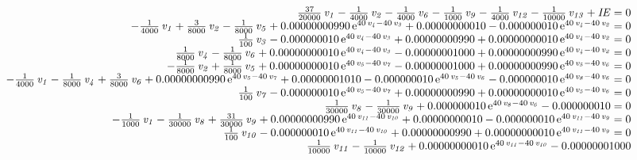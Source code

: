 \documentclass[conference,letterpaper,onecolumn]{IEEEtran}
\begin{document}
{\tiny
\begin{equation}
\begin{array}{r}
{\frac {37}{20000}}\,{\it v_1}-{\frac {1}{4000}}\,{\it v_2}-{\frac {1}{
 4000}}\,{\it v_6}-{\frac {1}{1000}}\,{\it v_9}-{\frac {1}{4000}}\,{\it 
v_{12}}-{\frac {1}{10000}}\,{\it v_{13}}+{\it IE}=0 \\
-{\frac {1}{4000}}\,{\it v_1}+{\frac {3}{8000}}\,{\it v_2}-{\frac {1}{
8000}}\,{\it v_5}+ 0.00000000990\,{{\rm e}^{40\,{\it v_4}-40\,{\it v_3}}}
+ 0.00000000010- 0.000000010\,{{\rm e}^{40\,{\it v_4}-40\,{\it v_2}}}=0  \\
{\frac {1}{100}}\,{\it v_3}- 0.000000010\,{{\rm e}^{40\,{\it v_4}-40\,{
\it v_3}}}+ 0.00000000990+ 0.00000000010\,{{\rm e}^{40\,{\it v_4}-40\,{
\it v_2}}}=0 \\
{\frac {1}{8000}}\,{\it v_4}-{\frac {1}{8000}}\,{\it v_6}+ 0.00000000010
\,{{\rm e}^{40\,{\it v_4}-40\,{\it v_3}}}- 0.00000001000+ 0.00000000990
\,{{\rm e}^{40\,{\it v_4}-40\,{\it v_2}}}=0 \\
-{\frac {1}{8000}}\,{\it v_2}+{\frac {1}{8000}}\,{\it v_5}+
 0.00000000010\,{{\rm e}^{40\,{\it v_5}-40\,{\it v_7}}}- 0.00000001000+
 0.00000000990\,{{\rm e}^{40\,{\it v_5}-40\,{\it v_6}}}=0 \\
-{\frac {1}{4000}}\,{\it v_1}-{\frac {1}{8000}}\,{\it v_4}+{\frac {3}{
8000}}\,{\it v_6}+ 0.00000000990\,{{\rm e}^{40\,{\it v_5}-40\,{\it v_7}}}
+ 0.00000001010- 0.000000010\,{{\rm e}^{40\,{\it v_5}-40\,{\it v_6}}}-
 0.000000010\,{{\rm e}^{40\,{\it v_8}-40\,{\it v_6}}}=0 \\
{\frac {1}{100}}\,{\it v_7}- 0.000000010\,{{\rm e}^{40\,{\it v_5}-40\,{
\it v_7}}}+ 0.00000000990+ 0.00000000010\,{{\rm e}^{40\,{\it v_5}-40\,{
\it v_6}}}=0 \\
{\frac {1}{30000}}\,{\it v_8}-{\frac {1}{30000}}\,{\it v_9}+ 0.000000010
\,{{\rm e}^{40\,{\it v_8}-40\,{\it v_6}}}- 0.000000010=0 \\
-{\frac {1}{1000}}\,{\it v_1}-{\frac {1}{30000}}\,{\it v_8}+{\frac {31}{
30000}}\,{\it v_9}+ 0.00000000990\,{{\rm e}^{40\,{\it v_{11}}-40\,{\it v_{10}
}}}+ 0.00000000010- 0.000000010\,{{\rm e}^{40\,{\it v_{11}}-40\,{\it v_9}}
}=0 \\
{\frac {1}{100}}\,{\it v_{10}}- 0.000000010\,{{\rm e}^{40\,{\it v_{11}}-40\,
{\it v_{10}}}}+ 0.00000000990+ 0.00000000010\,{{\rm e}^{40\,{\it v_{11}}-40
\,{\it v_9}}}=0 \\
{\frac {1}{10000}}\,{\it v_{11}}-{\frac {1}{10000}}\,{\it v_{12}}+
 0.00000000010\,{{\rm e}^{40\,{\it v_{11}}-40\,{\it v_{10}}}}- 0.00000001000

\end{array}
\end{equation}}
\end{document}
